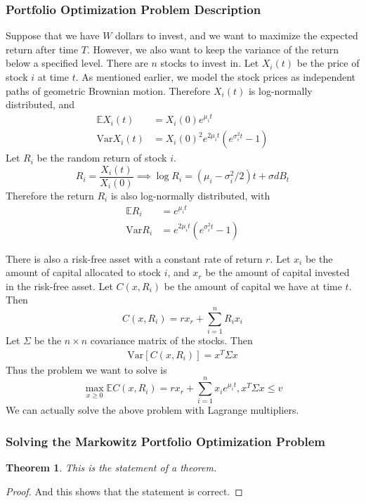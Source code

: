 \documentclass{amsart}
\newtheorem{thm}{Theorem}[section]
\theoremstyle{definition}
\theoremstyle{remark}
\begin{document}
\subsubsection{Portfolio Optimization Problem Description}
Suppose that we have $W$ dollars to invest, and we want to maximize the expected return after time $T$. However, we also want to keep the variance of the return below a specified level. There are $n$ stocks to invest in. Let $X_i(t)$ be the price of stock $i$ at time $t$. As mentioned earlier, we model the stock prices as independent paths of geometric Brownian motion. Therefore $X_i(t)$ is log-normally distributed, and
\begin{align*}
\mathbb{E} X_i(t) &= X_i(0)e^{\mu_i t}\\
\text{Var} X_i(t) &= X_i(0)^2e^{2\mu_i t}\left(e^{\sigma_i^2 t} -1\right)
\end{align*}
Let $R_i$ be the random return of stock $i$.
\begin{equation*}
R_i = \frac{X_i(t)}{X_i(0)} \implies \log R_i = (\mu_i - \sigma_i^2 / 2) t + \sigma dB_t
\end{equation*}
Therefore the return $R_i$ is also log-normally distributed, with
\begin{align*}
\mathbb{E}R_i &= e^{\mu_i t}\\
\text{Var}R_i &= e^{2\mu_i t}\left(e^{\sigma_i^2 t} -1\right)
\end{align*}

There is also a risk-free asset with a constant rate of return $r$. Let $x_i$ be the amount of capital allocated to stock $i$, and $x_r$ be the amount of capital invested in the risk-free asset. Let $C(x, R_i)$ be the amount of capital we have at time $t$. Then
\begin{equation*}
C(x, R_i) = r x_r + \sum_{i=1}^n R_i x_i 
\end{equation*}
Let $\Sigma$ be the $n\times n$ covariance matrix of the stocks. Then
\begin{align*}
\text{Var}[ C(x,R_i)] = x^T \Sigma x
\end{align*}
Thus the problem we want to solve is
\begin{equation}
\max_{x\ge 0} \mathbb{E}C(x, R_i) = r x_r + \sum_{i=1}^n x_i e^{\mu_i t}, x^T \Sigma x \le v
\end{equation}
We can actually solve the above problem with Lagrange multipliers.

\subsubsection{Solving the Markowitz Portfolio Optimization Problem}
\begin{thm}
This is the statement of a theorem.
\end{thm}
\begin{proof}
And this shows that the statement is correct.
\end{proof}
\end{document}
